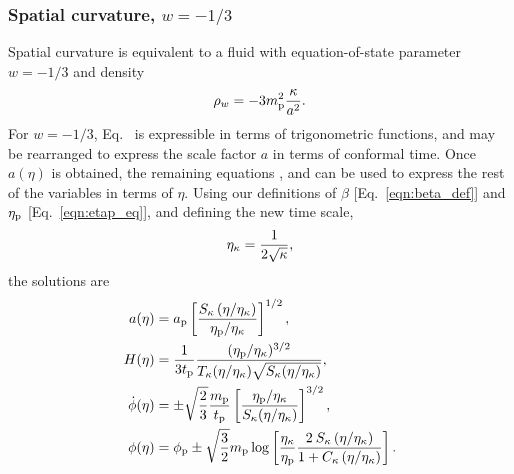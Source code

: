 \subsubsection{Spatial curvature, $w=-1/3$}
Spatial curvature is equivalent to a fluid with equation-of-state
parameter $w=-1/3$ and density
%
\begin{equation}
  \rho_w = -3m_{\mathrm{p}}^2\frac{\kappa}{a^{2}}.
\end{equation}
%
For $w=-1/3$, Eq.\  is expressible in terms of
trigonometric functions, and may be rearranged to express the scale
factor $a$ in terms of conformal time. Once $a(\eta)$ is obtained, the
remaining equations ,  and
 can be used to express the rest of the variables
in terms of $\eta$. Using our definitions of $\beta$
[Eq.\ \nolinebreak\ref{eqn:beta_def}] and $\eta_{\mathrm{p}}$
[Eq.\ \nolinebreak\ref{eqn:etap_eq}], and defining the new time scale,
%
\begin{equation}
  \eta_\mathrm{\kappa} = \frac{1}{2\sqrt{\kappa}},
  \label{eqn:etak}
\end{equation}
%
the solutions are 
%
\begin{align}
  a(\eta)
  &=
  a_{\mathrm{p}}\left[
  \frac
  {S_\kappa\left(\eta/\eta_\mathrm{\kappa}\right)}
  {\eta_{\mathrm{p}}/\eta_\mathrm{\kappa}} \right]^{1/2},
  \\
  H(\eta)
  &=
  \frac{1}{3t_{\mathrm{p}}}
  \frac{(\eta_{\mathrm{p}}/\eta_\mathrm{\kappa})^{3/2}}
  {T_\kappa(\eta/\eta_\mathrm{\kappa})\sqrt{S_\kappa(\eta/\eta_\mathrm{\kappa})}}, 
  \\
  \dot{\phi}(\eta)
  &=
  \pm\sqrt{\frac{2}{3}}
  \frac{m_{\mathrm{p}}}{t_{\mathrm{p}}}
  \left[
  \frac
  {\eta_{\mathrm{p}}/\eta_\mathrm{\kappa}}
  {S_{\kappa}(\eta/\eta_\mathrm{\kappa})}
  \right]^{3/2},
  \\
  \phi(\eta) 
  &=
  \phi_{\mathrm{p}} \pm \sqrt{\frac{3}{2}}m_{\mathrm{p}}\log  \left[
  \frac{\eta_\mathrm{\kappa}}{\eta_{\mathrm{p}}} 
  \frac{2\:S_{\kappa}\left(\eta/\eta_\mathrm{\kappa} \right) }
  {1 + C_{\kappa} \left( \eta/\eta_\mathrm{\kappa} \right)   }  
  \right]. 
\end{align}
%



